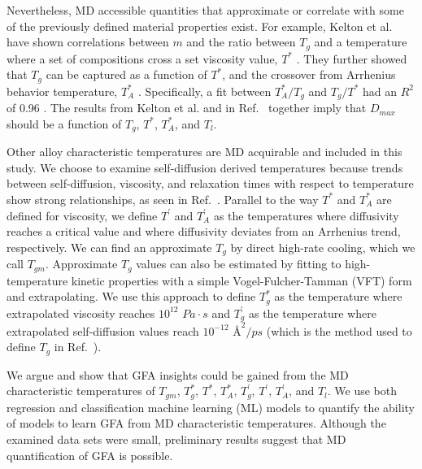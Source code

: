 \documentclass[11pt,a4paper]{article}                                %
\begin{document}
\par
Nevertheless, MD accessible quantities that approximate or correlate with some of the previously defined material properties exist. For example, Kelton et al. have shown correlations between $m$ and the ratio between $T_{g}$ and a temperature where a set of compositions cross a set viscosity value, $T^{*}$ \cite{Gangopadhyay2017-2, Gangopadhyay2017-1}. They further showed that $T_{g}$ can be captured as a function of $T^{*}$, and the crossover from Arrhenius behavior temperature, $T_{A}^{*}$ \cite{Dai2019-1}. Specifically, a fit between $T_{A}^{*}/T_{g}$ and $T_{g}/T^{*}$ had an $R^{2}$ of 0.96 \cite{Gangopadhyay2017-1}. The results from Kelton et al. and in Ref.~\cite{Johnson2016} together imply that $D_{max}$ should be a function of $T_{g}$, $T^{*}$, $T_{A}^{*}$, and $T_{l}$.

\par
Other alloy characteristic temperatures are MD acquirable and included in this study. We choose to examine self-diffusion derived temperatures because trends between self-diffusion, viscosity, and relaxation times with respect to temperature show strong relationships, as seen in Ref.~\cite{Puosi2018}. Parallel to the way $T^{*}$ and $T_{A}^{*}$ are defined for viscosity, we define $T^{'}$ and $T_{A}^{'}$ as the temperatures where diffusivity reaches a critical value and where diffusivity deviates from an Arrhenius trend, respectively. We can find an approximate $T_{g}$ by direct high-rate cooling, which we call $T_{gm}$. Approximate $T_{g}$ values can also be estimated by fitting to high-temperature kinetic properties with a simple Vogel-Fulcher-Tamman (VFT) form and extrapolating. We use this approach to define $T_{g}^{*}$ as the temperature where extrapolated viscosity reaches $10^{12}$ $Pa \cdot s$ \cite{Angell1995} and $T_{g}^{'}$ as the temperature where extrapolated self-diffusion values reach $10^{-12}$ $\text{\AA}^{2}/ps$ (which is the method used to define $T_{g}$ in Ref.~\cite{Chen2016}).

\par
We argue and show that GFA insights could be gained from the MD characteristic temperatures of $T_{gm}$, $T_{g}^{*}$, $T^{*}$, $T_{A}^{*}$, $T_{g}^{'}$, $T^{'}$, $T_{A}^{'}$, and $T_{l}$. We use both regression and classification machine learning (ML) models to quantify the ability of models to learn GFA from MD characteristic temperatures. Although the examined data sets were small, preliminary results suggest that MD quantification of GFA is possible.
\end{document}
